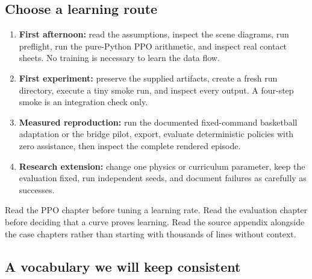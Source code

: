 \documentclass[
  american,
  11pt,
  letterpaper,
]{article}
\providecommand{\tightlist}{%
  \setlength{\itemsep}{0pt}\setlength{\parskip}{0pt}}
\begin{document}
\subsection{Choose a learning route}\label{choose-a-learning-route}

\begin{enumerate}
\def\labelenumi{\arabic{enumi}.}
\tightlist
\item
  \textbf{First afternoon:} read the assumptions, inspect the scene
  diagrams, run preflight, run the pure-Python PPO arithmetic, and
  inspect real contact sheets. No training is necessary to learn the
  data flow.
\item
  \textbf{First experiment:} preserve the supplied artifacts, create a
  fresh run directory, execute a tiny smoke run, and inspect every
  output. A four-step smoke is an integration check only.
\item
  \textbf{Measured reproduction:} run the documented fixed-command
  basketball adaptation or the bridge pilot, export, evaluate
  deterministic policies with zero assistance, then inspect the complete
  rendered episode.
\item
  \textbf{Research extension:} change one physics or curriculum
  parameter, keep the evaluation fixed, run independent seeds, and
  document failures as carefully as successes.
\end{enumerate}

Read the PPO chapter before tuning a learning rate. Read the evaluation
chapter before deciding that a curve proves learning. Read the source
appendix alongside the case chapters rather than starting with thousands
of lines without context.

\subsection{A vocabulary we will keep
consistent}\label{a-vocabulary-we-will-keep-consistent}
\end{document}
